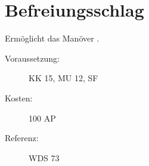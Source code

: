 \section{Befreiungsschlag}
\label{sf.befreiungsschlag}
Ermöglicht das Manöver .
\begin{description}
    \item[Voraussetzung:]
        KK 15, MU 12, SF 
    \item [Kosten:]
        100 AP
    \item [Referenz:]
        WDS 73
\end{description}
